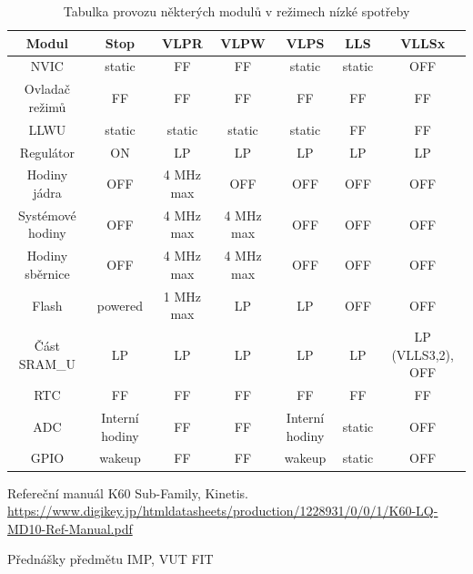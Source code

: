 \documentclass{article}
\begin{document}
\begin{table}[h]
\begin{adjustwidth}{-2.8cm}{1cm}
\begin{tabular}{ | c | c | c | c | c | c | c | }
    \hline
    \textbf{Modul} & \textbf{Stop} & \textbf{VLPR} & \textbf{VLPW} &
    \textbf{VLPS} & \textbf{LLS} & \textbf{VLLSx} \\
    \hline
    NVIC & static & FF & FF & static & static & OFF \\
    \hline
    Ovladač režimů & FF & FF & FF & FF & FF & FF \\
    \hline
    LLWU & static & static & static & static & FF & FF \\
    \hline
    Regulátor & ON & LP & LP & LP & LP & LP \\
    \hline
    Hodiny jádra & OFF & 4 MHz max & OFF & OFF & OFF & OFF \\
    \hline
    Systémové hodiny & OFF & 4 MHz max & 4 MHz max & OFF & OFF & OFF \\
    \hline
    Hodiny sběrnice & OFF & 4 MHz max & 4 MHz max & OFF & OFF & OFF \\
    \hline
    Flash & powered & 1 MHz max & LP & LP & OFF & OFF \\
    \hline
    Část SRAM\_U & LP & LP & LP & LP & LP & LP (VLLS3,2), OFF \\
    \hline
    RTC & FF & FF & FF & FF & FF & FF \\
    \hline
    ADC & Interní hodiny & FF & FF & Interní hodiny & static & OFF \\
    \hline
    GPIO & wakeup & FF & FF & wakeup & static & OFF \\
    \hline
\end{tabular}
\end{adjustwidth}
\caption{Tabulka provozu některých modulů v režimech nízké spotřeby}
\end{table}

\begin{thebibliography}{9}

 Refereční manuál K60 Sub-Family, Kinetis.
\url{https://www.digikey.jp/htmldatasheets/production/1228931/0/0/1/K60-LQ-MD10-Ref-Manual.pdf}

 Přednášky předmětu IMP, VUT FIT

\end{thebibliography}
\end{document}
